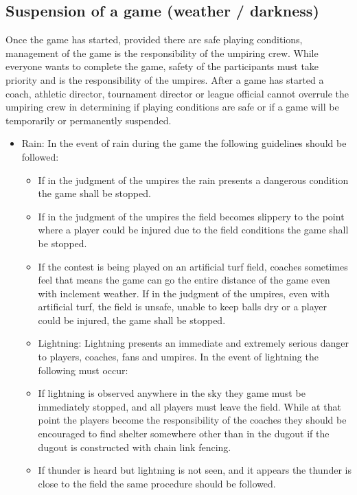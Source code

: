 \documentclass[letterpaper,11pt,colorlinks=true,allcolors=blue]{article}
\begin{document}
\subsection*{Suspension of a game (weather / darkness)}
Once the game has started, provided there are safe playing conditions, management of the game is the responsibility of the umpiring crew. While everyone wants to complete the game, safety of the participants must take priority and is the responsibility of the umpires. After a game has started a coach, athletic director, tournament director or league official cannot overrule the umpiring crew in determining if playing conditions are safe or if a game will be temporarily or permanently suspended. 
\begin{itemize}
\item  Rain: In the event of rain during the game the following guidelines should be followed:
\begin{itemize}
\item  If in the judgment of the umpires the rain presents a dangerous condition the game shall be stopped.
\item  If in the judgment of the umpires the field becomes slippery to the point where a player could be injured due to the field conditions the game shall be stopped. 
\item If the contest is being played on an artificial turf field, coaches sometimes feel that means the game can go the entire distance of the game even with inclement weather.  If in the judgment of the umpires, even with artificial turf, the field is unsafe, unable to keep balls dry or a player could be injured, the game shall be stopped.
\item  Lightning: Lightning presents an immediate and extremely serious danger to players, coaches, fans and umpires. In the event of lightning the following must occur:
\item  If lightning is observed anywhere in the sky they game must be immediately stopped, and all players must leave the field. While at that point the players become the responsibility of the coaches they should be encouraged to find shelter somewhere other than in the dugout if the dugout is constructed with chain link fencing. 
\item  If thunder is heard but lightning is not seen, and it appears the thunder is close to the field the same procedure should be followed.
\end{itemize}
\end{itemize}
\end{document}

